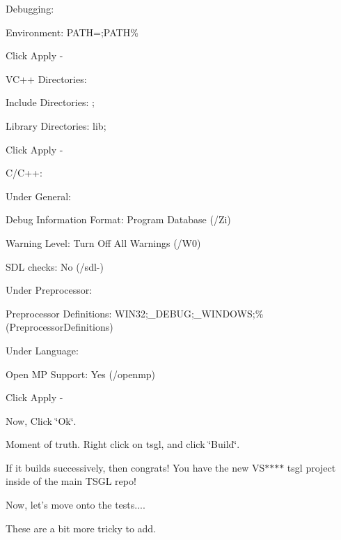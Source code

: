 Debugging\-:


\begin{DoxyItemize}
\item Environment\-: P\-A\-T\-H=;P\-A\-T\-H\% 
\item Click Apply -\/
\end{DoxyItemize}

V\-C++ Directories\-:


\begin{DoxyItemize}
\item Include Directories\-: ;
\item Library Directories\-: lib;
\item Click Apply -\/
\end{DoxyItemize}

C/\-C++\-:


\begin{DoxyItemize}
\item Under General\-:
\begin{DoxyItemize}
\item Debug Information Format\-: Program Database (/\-Zi)
\item Warning Level\-: Turn Off All Warnings (/\-W0)
\item S\-D\-L checks\-: No (/sdl-\/)
\end{DoxyItemize}
\item Under Preprocessor\-:
\begin{DoxyItemize}
\item Preprocessor Definitions\-: W\-I\-N32;\-\_\-\-D\-E\-B\-U\-G;\-\_\-\-W\-I\-N\-D\-O\-W\-S;\%(Preprocessor\-Definitions)
\end{DoxyItemize}
\item Under Language\-:
\begin{DoxyItemize}
\item Open M\-P Support\-: Yes (/openmp)
\end{DoxyItemize}
\item Click Apply -\/
\end{DoxyItemize}

Now, Click \char`\"{}\-Ok\char`\"{}.

Moment of truth. Right click on tsgl, and click \char`\"{}\-Build\char`\"{}.

If it builds successively, then congrats! You have the new V\-S$\ast$$\ast$$\ast$$\ast$ tsgl project inside of the main T\-S\-G\-L repo!

Now, let's move onto the tests....

These are a bit more tricky to add.


